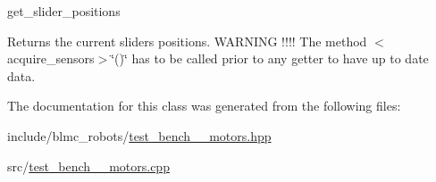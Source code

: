 get\+\_\+slider\+\_\+positions 

\begin{DoxyReturn}{Returns}
the current sliders positions. W\+A\+R\+N\+I\+NG !!!! The method $<$acquire\+\_\+sensors$>$\char`\"{}()\char`\"{} has to be called prior to any getter to have up to date data. 
\end{DoxyReturn}


The documentation for this class was generated from the following files\+:\begin{DoxyCompactItemize}
\item 
include/blmc\+\_\+robots/\hyperlink{test__bench__8__motors_8hpp}{test\+\_\+bench\+\_\+\_\+motors.\+hpp}\item 
src/\hyperlink{test__bench__8__motors_8cpp}{test\+\_\+bench\+\_\+\_\+motors.\+cpp}\end{DoxyCompactItemize}
